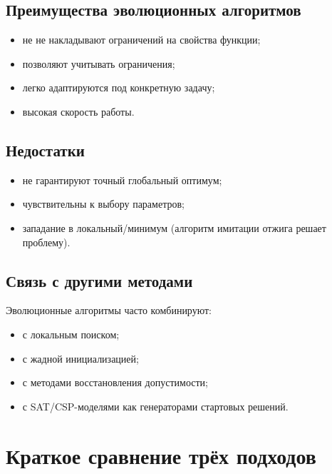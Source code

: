 \documentclass[12pt,a4paper]{article}
\theoremstyle{definition}
\theoremstyle{plain}
\begin{document}
\subsection{Преимущества эволюционных алгоритмов}
\begin{itemize}
\item не не накладывают ограничений на свойства функции;
\item позволяют учитывать ограничения;
\item легко адаптируются под конкретную задачу;
\item высокая скорость работы.
\end{itemize}

\subsection{Недостатки}
\begin{itemize}
\item не гарантируют точный глобальный оптимум;
\item чувствительны к выбору параметров;
\item западание в локальный/минимум (алгоритм имитации отжига решает проблему).
\end{itemize}

\subsection{Связь с другими методами}
Эволюционные алгоритмы часто комбинируют:
\begin{itemize}
\item с локальным поиском;
\item с жадной инициализацией;
\item с методами восстановления допустимости;
\item с SAT/CSP-моделями как генераторами стартовых решений.
\end{itemize}

\section{Краткое сравнение трёх подходов}
\end{document}
